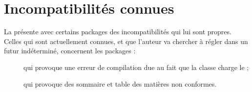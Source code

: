 \chapter{Incompatibilités connues}
\label{cha:incomp-conn}

La \yatcl{} présente avec certains packages des incompatibilités qui lui sont
propres. Celles qui sont actuellement connues, et que l'auteur va chercher
à régler dans un futur indéterminé, concernent les packages :
\begin{description}
\item[] qui provoque une erreur de compilation due au fait
  que la classe charge le  ;
\item[] qui provoque des sommaire et table des matières
  non conformes.
\end{description}
